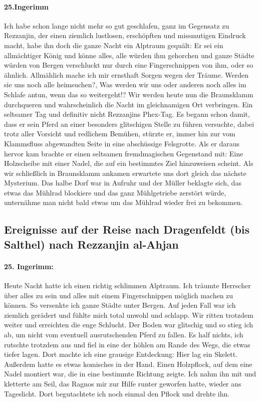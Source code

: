 \paragraph{25.Ingerimm}

Ich habe schon lange nicht mehr so gut geschlafen, ganz im Gegensatz zu Rezzanjin, der einen ziemlich lustlosen, erschöpften und missmutigen Eindruck macht, habe ihn doch die ganze Nacht ein Alptraum gequält: Er sei ein allmächtiger König und könne alles, alle würden ihm gehorchen und ganze Städte würden von Bergen verschluckt nur durch eine Fingerschnippen von ihm, oder so ähnlich. Allmählich mache ich mir ernsthaft Sorgen wegen der Träume. Werden sie uns noch alle heimsuchen?, Was werden wir uns oder anderen noch alles im Schlafe antun, wenn das so weitergeht!? Wir werden heute nun die Braunsklamm durchqueren und wahrscheinlich die Nacht im gleichnamigen Ort verbringen.
Ein seltsamer Tag und definitiv nicht Rezzanjins Phex-Tag. Es begann schon damit, dass er sein Pferd an einer besonders glitschigen Stelle zu führen versuchte, dabei trotz aller Vorsicht und redlichem Bemühen, stürzte er, immer hin zur vom Klammsfluss abgewandten Seite in eine abschüssige Felsgrotte. Als er daraus hervor kam brachte er einen seltsamen fremdmagischen Gegenstand mit: Eine Holzscheibe mit einer Nadel, die auf ein bestimmtes Ziel hinzuweisen scheint. Als wir schließlich in Braunsklamm ankamen erwartete uns dort gleich das nächste Mysterium. Das halbe Dorf war in Aufruhr und der Müller beklagte sich, das etwas das Mühlrad blockiere und das ganz Mühlgetriebe zerstört würde, unternähme man nicht bald etwas um das Mühlrad wieder frei zu bekommen.

\subsection{Ereignisse auf der Reise nach Dragenfeldt (bis Salthel) nach Rezzanjin al-Ahjan}

\paragraph{25. Ingerimm:}
Heute Nacht hatte ich einen richtig schlimmen Alptraum. Ich träumte Herrscher über alles zu sein und alles mit einem Fingerschnippen möglich machen zu können. So versenkte ich ganze Städte unter Bergen. Auf jeden Fall war ich ziemlich gerädert und fühlte mich total unwohl und schlapp. Wir ritten trotzdem weiter und erreichten die enge Schlucht. Der Boden war glitschig und so stieg ich ab, um nicht vom eventuell ausrutschenden Pferd zu fallen. Es half nichts, ich rutschte trotzdem aus und fiel in eine der höhlen am Rande des Wegs, die etwas tiefer lagen. Dort machte ich eine grausige Entdeckung: Hier lag ein Skelett. Außerdem hatte es etwas komisches in der Hand. Einen Holzpflock, auf dem eine Nadel montiert war, die in eine bestimmte Richtung zeigte. Ich nahm ihn mit und kletterte am Seil, das Ragnos mir zur Hilfe runter geworfen hatte, wieder ans Tageslicht. Dort begutachtete ich noch einmal den Pflock und drehte ihn.\par

